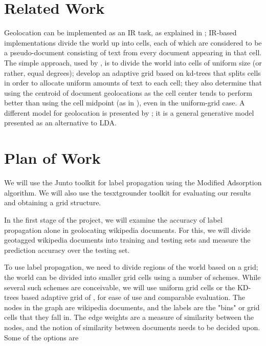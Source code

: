 \documentclass[11pt]{article}
\begin{document}
\section{Related Work}
Geolocation can be implemented as an IR task, as explained in \cite{skiles:12};
IR-based implementations divide the world up into cells, each
of which are considered to be a pseudo-document consisting of text from every
document appearing in that cell.
The simple approach, used by \cite{wing-baldridge:11}, is to divide the world
into cells of uniform size (or rather, equal degrees);
\cite{rolleretal:12} develop an adaptive grid based on kd-trees that splits cells in order to
allocate uniform amounts of text to each cell; 
they also determine that using the centroid of document geolocations as the
cell center tends to perform better than using the cell midpoint (as in
\cite{wing-baldridge:11}), even in the uniform-grid case.
A different model for geolocation is presented by \cite{eisensteinetal:11}; it
is a general generative model presented as an alternative to LDA.

\cite{talukdar:09} \cite{talukdar:10}

\section{Plan of Work}
We will use the Junto toolkit \cite{junto} for label propagation using the Modified Adsorption algorithm.
We will also use the tesxtgrounder toolkit for evaluating our results and obtaining a grid structure.

In the first stage of the project, we will examine the accuracy of label propagation alone in
geolocating wikipedia documents. For this, we will divide geotagged wikipedia documents
into training and testing sets and measure the prediction accuracy over the testing set.


To use label propagation, we need to divide regions of the world based on a grid; 
the world can be divided into smaller grid cells using a number of schemes. 
While several such schemes are conceivable, we will use uniform grid cells or the KD-trees based adaptive grid of \cite{rolleretal:12}, for ease of use and comparable evaluation. 
The nodes in the graph are wikipedia documents, and the labels are the "bins" or 
grid cells that they fall in. The edge weights are a measure of similarity between the nodes, 
and the notion of similarity between documents needs to be decided upon. 
Some of the options are %
\end{document}
